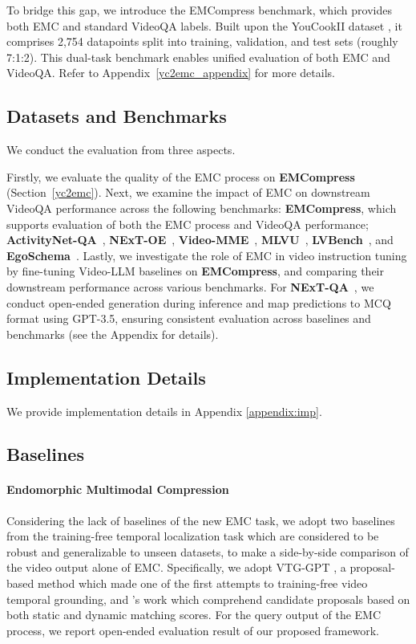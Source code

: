 To bridge this gap, we introduce the EMCompress benchmark, which provides both EMC and standard VideoQA labels. Built upon the YouCookII dataset \citep{ZhXuCoAAAI18}, it comprises 2,754 datapoints split into training, validation, and test sets (roughly 7:1:2). This dual-task benchmark enables unified evaluation of both EMC and VideoQA. Refer to Appendix~\ref{yc2emc_appendix} for more details.



\subsection{Datasets and Benchmarks}
We conduct the evaluation from three aspects.

Firstly, we evaluate the quality of the EMC process on \textbf{EMCompress} (Section~\ref{yc2emc}). Next, we examine the impact of EMC on downstream VideoQA performance across the following benchmarks: \textbf{EMCompress}, which supports evaluation of both the EMC process and VideoQA performance; \textbf{ActivityNet-QA}~\citep{yu2019activityqa}, \textbf{NExT-OE}~\citep{xiao2021next}, \textbf{Video-MME}~\citep{videomme}, \textbf{MLVU}~\citep{mlvu}, \textbf{LVBench}~\citep{lvbench}, and \textbf{EgoSchema}~\citep{egoschema}. Lastly, we investigate the role of EMC in video instruction tuning by fine-tuning Video-LLM baselines on \textbf{EMCompress}, and comparing their downstream performance across various benchmarks. For \textbf{NExT-QA}~\citep{xiao2021next}, we conduct open-ended generation during inference and map predictions to MCQ format using GPT-3.5, ensuring consistent evaluation across baselines and benchmarks (see the Appendix for details).

\subsection{Implementation Details}
We provide implementation details in Appendix \ref{appendix:imp}.

\subsection{Baselines}

\paragraph{Endomorphic Multimodal Compression}
 Considering the lack of baselines of the new EMC task, we adopt two baselines from the training-free temporal localization task which are considered to be robust and generalizable to unseen datasets, to make a side-by-side comparison of the video output alone of EMC. Specifically, we adopt VTG-GPT \citep{vtggpt}, a proposal-based method which made one of the first attempts to training-free video temporal grounding, and \citet{tfvtg}'s work which comprehend candidate proposals based on both static and dynamic matching scores. For the query output of the EMC process, we report open-ended evaluation result of our proposed framework.

